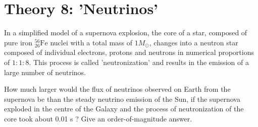 \documentclass[10pt]{article}
\begin{document}
\section*{Theory 8: 'Neutrinos'}
In a simplified model of a supernova explosion, the core of a star, composed of pure iron ${ }_{26}^{56} \mathrm{Fe}$ nuclei with a total mass of $1 M_{\odot}$, changes into a neutron star composed of individual electrons, protons and neutrons in numerical proportions of $1: 1: 8$. This process is called 'neutronization' and results in the emission of a large number of neutrinos.

How much larger would the flux of neutrinos observed on Earth from the supernova be than the steady neutrino emission of the Sun, if the supernova exploded in the centre of the Galaxy and the process of neutronization of the core took about 0.01 s ? Give an order-of-magnitude answer.\\
\end{document}
